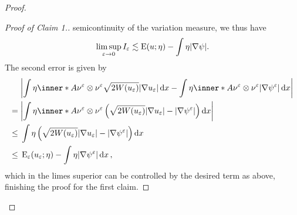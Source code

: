\begin{proof}
\begin{proof}[Proof of Claim 1.]
		semicontinuity of the variation measure, we thus have
		\begin{equation*}
			\limsup_{ \varepsilon \to 0 }
				I_{ \varepsilon }
			\lesssim
			\operatorname{E} ( u ; \eta )
			-
			\int
				\eta
			\abs{ \nabla \psi }.
		\end{equation*}
		The second error is given by
		\begin{align*}
			& \abs{
				\int
					\eta
					\inner*{ A }{ \nu^{ \varepsilon } \otimes \nu^{ \varepsilon 
					} }
					\sqrt{ 2 W ( u_{ \varepsilon } ) }
					\abs{ \nabla u_{ \varepsilon } }
				\dd{ x }
				-
				\int
					\eta
					\inner*{ A }{ \nu^{ \varepsilon } \otimes \nu^{ \varepsilon 
					} }
					\abs{ \nabla \psi^{ \varepsilon } }
				\dd{ x }
			}
			\\
			={} &
			\abs{
				\int
					\eta
					\inner*{ A }{ \nu^{ \varepsilon } \otimes \nu^{ \varepsilon 
					} }
					\left(
						\sqrt{ 2 W ( u_{ \varepsilon } ) } \abs{ \nabla u_{ 
						\varepsilon } } 
						-
						\abs{ \nabla \psi^{ \varepsilon } }
					\right)
				\dd{ x }
			}
			\\
			\leq {} &
			\int
				\eta
				\left(
					\sqrt{ 2 W ( u_{ \varepsilon } ) }
					\abs{ \nabla u_{ \varepsilon } }
					-
					\abs{ \nabla \psi^{ \varepsilon } }
				\right)
			\dd{ x }
			\\
			\leq{} &
			\energy_{ \varepsilon } ( u_{ \varepsilon } ; \eta )
			-
			\int
				\eta 
				\abs{ \nabla \psi^{ \varepsilon } }
			\dd{ x },
		\end{align*}
		which in the limes superior can be controlled by the desired term as 
		above, finishing the proof for the first claim.
	\end{proof}
	

\end{proof}
